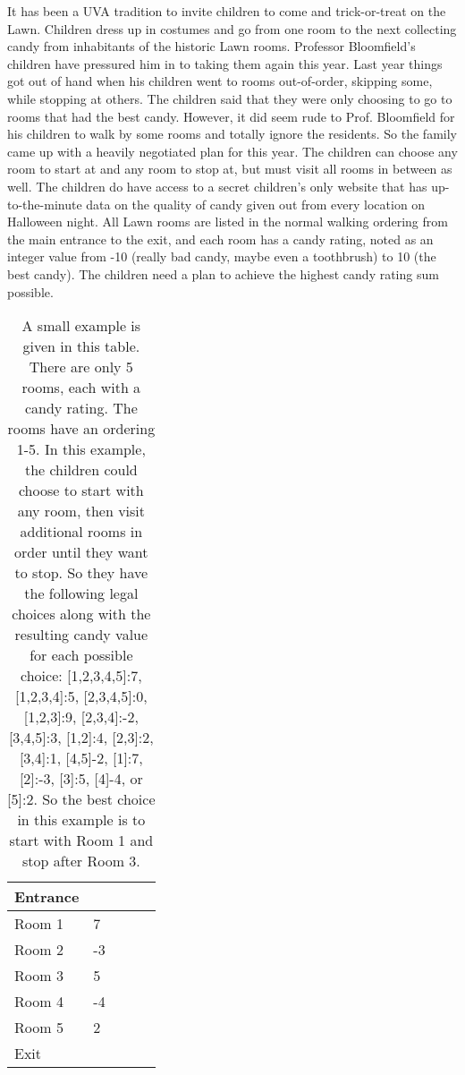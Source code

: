 \documentclass[10pt]{article}
\begin{document}
It has been a UVA tradition to invite children to come and trick-or-treat on the Lawn. Children dress up in costumes and go from one room to the next collecting candy from inhabitants of the historic Lawn rooms. Professor Bloomfield's children have pressured him in to taking them again this year. Last year things got out of hand when his children went to rooms out-of-order, skipping some, while stopping at others. The children said that they were only choosing to go to rooms that had the best candy. However, it did seem rude to Prof. Bloomfield for his children to walk by some rooms and totally ignore the residents. So the family came up with a heavily negotiated plan for this year. The children can choose any room to start at and any room to stop at, but must visit all rooms in between as well. The children do have access to a secret children's only website that has up-to-the-minute data on the quality of candy given out from every location on Halloween night. All Lawn rooms are listed in the normal walking ordering from the main entrance to the exit, and each room has a candy rating, noted as an integer value from -10 (really bad candy, maybe even a toothbrush) to 10 (the best candy). The children need a plan to achieve the highest candy rating sum possible.


\begin{table}[]
\centering
\begin{tabular}{lllll}
\hline
Entrance &  &  &  &  \\ \hline
Room 1   &  7 &  &  &  \\
Room 2   &  -3 &  &  &  \\
Room 3   &  5 &  &  &  \\
Room 4   &  -4 &  &  &  \\
Room 5   &  2 &  &  &  \\ \hline
Exit   &  &  &  &  \\
\hline
\end{tabular}
\caption{A small example is given in this table. There are only 5 rooms, each with a candy rating. The rooms have an ordering 1-5. In this example, the children could choose to start with any room, then visit additional rooms in order until they want to stop. So they have the following legal choices along with the resulting candy value for each possible choice: [1,2,3,4,5]:7, [1,2,3,4]:5, [2,3,4,5]:0, [1,2,3]:9, [2,3,4]:-2, [3,4,5]:3, [1,2]:4, [2,3]:2, [3,4]:1, [4,5]-2, [1]:7, [2]:-3, [3]:5, [4]-4, or [5]:2. So the best choice in this example is to start with Room 1 and stop after Room 3. }
\end{table}
\end{document}
